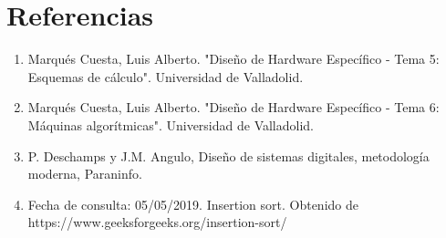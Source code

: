 \documentclass[12pt,a4paper,oneside]{article}
\begin{document}
\section{Referencias}
\begin{enumerate}
\item Marqués Cuesta, Luis Alberto. "Diseño de Hardware Específico - Tema 5: Esquemas de cálculo". Universidad de Valladolid.
\item Marqués Cuesta, Luis Alberto. "Diseño de Hardware Específico - Tema 6: Máquinas algorítmicas". Universidad de Valladolid.
\item P. Deschamps y J.M. Angulo, Diseño de sistemas digitales, metodología moderna, Paraninfo. 
\item Fecha de consulta: 05/05/2019. Insertion sort. Obtenido de \\
https://www.geeksforgeeks.org/insertion-sort/ \label{ins_sort_ref}
\end{enumerate}
\end{document}
